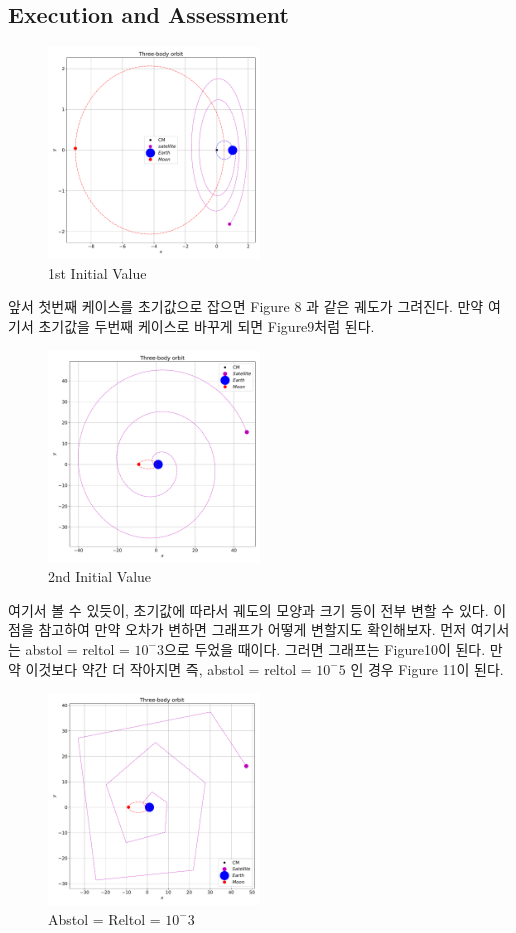 \documentclass[11pt]{article}
\begin{document}
\subsection{Execution and Assessment}
\begin{figure}[!ht]
  \centering
  \includegraphics[width=0.5\textwidth]{Three1.pdf}
  \caption{1st Initial Value}
\end{figure}
앞서 첫번째 케이스를 초기값으로 잡으면 Figure 8 과 같은 궤도가 그려진다. 만약 여기서 초기값을 두번째 케이스로 바꾸게 되면 Figure9처럼 된다.
\begin{figure}[!ht]
  \centering
  \includegraphics[width=0.5\textwidth]{Three2.pdf}
  \caption{2nd Initial Value}
\end{figure}
여기서 볼 수 있듯이, 초기값에 따라서 궤도의 모양과 크기 등이 전부 변할 수 있다. 이점을 참고하여 만약 오차가 변하면 그래프가 어떻게 변할지도 확인해보자.
먼저 여기서는 abstol = reltol = $10^-3$으로 두었을 때이다. 그러면 그래프는 Figure10이 된다. 만약 이것보다 약간 더 작아지면 즉, abstol = reltol = $10^-5$ 인 경우 Figure 11이 된다.

\begin{figure}[!ht]
  \centering
  \includegraphics[width=0.5\textwidth]{Three3.pdf}
  \caption{Abstol = Reltol = $10^-3$}
\end{figure}
\end{document}
